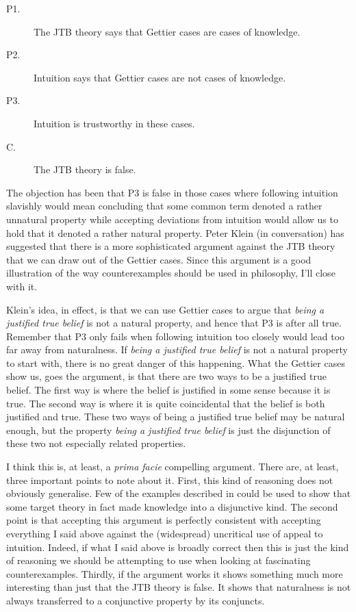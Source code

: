 \begin{description}
\item[P1.] The JTB theory says that Gettier cases are cases of knowledge.
\item[P2.] Intuition says that Gettier cases are not cases of knowledge.
\item[P3.] Intuition is trustworthy in these cases.
\item[C.] The JTB theory is false.
\end{description}

\noindent The objection has been that P3 is false in those cases where following intuition slavishly would mean concluding that some common term denoted a rather unnatural property while accepting deviations from intuition would allow us to hold that it denoted a rather natural property. Peter Klein (in conversation) has suggested that there is a more sophisticated argument against the JTB theory that we can draw out of the Gettier cases. Since this argument is a good illustration of the way counterexamples should be used in philosophy, I'll close with it.

Klein's idea, in effect, is that we can use Gettier cases to argue that \textit{being a justified true belief} is not a natural property, and hence that P3 is after all true. Remember that P3 only fails when following intuition too closely would lead too far away from naturalness. If \textit{being a justified true belief} is not a natural property to start with, there is no great danger of this happening. What the Gettier cases show us, goes the argument, is that there are two ways to be a justified true belief. The first way is where the belief is justified in some sense because it is true. The second way is where it is quite coincidental that the belief is both justified and true. These two ways of being a justified true belief may be natural enough, but the property \textit{being a justified true belief} is just the disjunction of these two not especially related properties.

I think this is, at least, a \textit{prima facie} compelling argument. There are, at least, three important points to note about it. First, this kind of reasoning does not obviously generalise. Few of the examples described in \citet{Shope1983} could be used to show that some target theory in fact made knowledge into a disjunctive kind. The second point is that accepting this argument is perfectly consistent with accepting everything I said above against the (widespread) uncritical use of appeal to intuition. Indeed, if what I said above is broadly correct then this is just the kind of reasoning we should be attempting to use when looking at fascinating counterexamples. Thirdly, if the argument works it shows something much more interesting than just that the JTB theory is false. It shows that naturalness is not always transferred to a conjunctive property by its conjuncts. 

